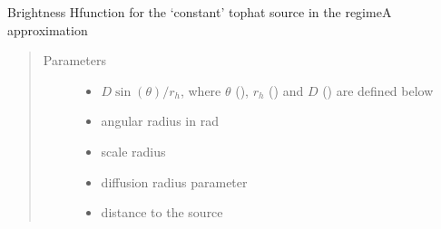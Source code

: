 \documentclass[letterpaper,10pt,english]{sphinxmanual}
\begin{document}
\begin{fulllineitems}
\label{\detokenize{diffsph.profiles:diffsph.profiles.analytics.cobrA}}
\sphinxAtStartPar
Brightness H\sphinxhyphen{}function for the ‘constant’ top\sphinxhyphen{}hat source in the regime\sphinxhyphen{}A approximation
\begin{quote}\begin{description}
\item[{Parameters}] \leavevmode\begin{itemize}
\item {} 
\sphinxAtStartPar
{} \textendash{} \(D\sin(\theta)/r_h\), where \(\theta\) (), \(r_h\) () and \(D\) () are defined below

\item {} 
\sphinxAtStartPar
{} \textendash{} angular radius in rad

\item {} 
\sphinxAtStartPar
{} \textendash{} scale radius

\item {} 
\sphinxAtStartPar
{} \textendash{} diffusion radius parameter

\item {} 
\sphinxAtStartPar
{} \textendash{} distance to the source

\end{itemize}

\end{description}\end{quote}

\end{fulllineitems}

\end{document}
